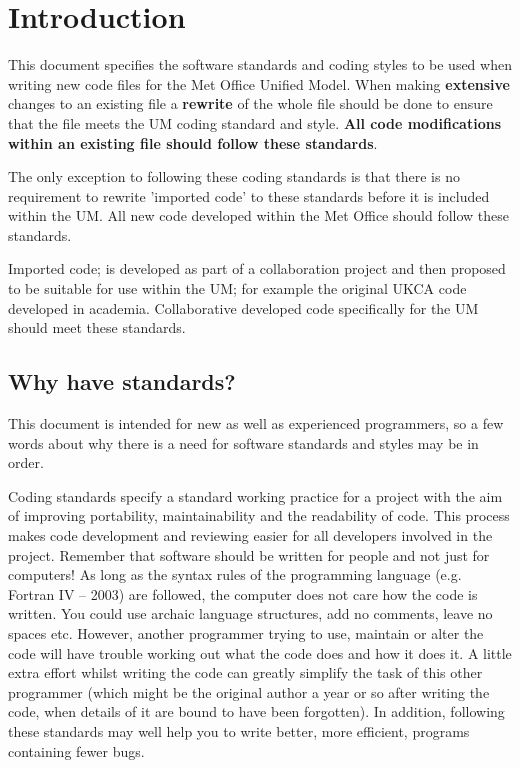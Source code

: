 \section{Introduction}
\label{sec:intro}

This document specifies the software standards and coding styles to be used when writing new 
code files for the Met Office Unified Model. When making {\bf extensive} changes to an 
existing file a {\bf rewrite} of the whole file should be done to ensure that the file meets 
the UM coding standard and style. {\bf All code modifications within an existing file 
should follow these standards}.

The only exception to following these coding standards is that there is no requirement 
to rewrite 'imported code' to these standards before it is included within the UM. 
All new code developed within the Met Office should follow these standards.

Imported code; is developed as part of a collaboration project 
and then proposed to be suitable for use within the UM; for example the original 
UKCA code developed in academia. Collaborative developed code specifically for the 
UM should meet these standards.

\subsection{Why have standards?}

This document is intended for new as well as 
experienced programmers, so a few words about why there is a need for 
software standards and styles may be in order. 

Coding standards specify a standard working practice for a project 
with the aim of improving portability, maintainability and the readability of code. 
This process makes code development and reviewing easier for all developers 
involved in the project. Remember that software should be written for people 
and not just for computers! As long as the syntax rules of the programming language 
(e.g. Fortran IV -- 2003) are followed, the computer does not care how the code is written. 
You could use archaic language structures, add no comments, leave no spaces etc. 
However, another programmer trying to use, maintain or alter the code will have 
trouble working out what the code does and how it does it. 
A little extra effort whilst writing the code can greatly simplify the task of 
this other programmer (which might be the original author a year or so after 
writing the code, when details of it are bound to have been forgotten). 
In addition, following these standards may well help you to write better, 
more efficient, programs containing fewer bugs.

